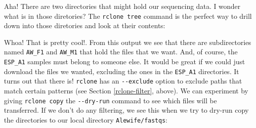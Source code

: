 \documentclass[]{krantz}
\makeatletter
\newenvironment{Shaded}{\begin{snugshade}}{\end{snugshade}}
\newcommand{\ExtensionTok}[1]{#1}
\newcommand{\NormalTok}[1]{#1}
\newenvironment{kframe}{%
\medskip{}
\setlength{\fboxsep}{.8em}
 \def\at@end@of@kframe{}%
 \ifinner\ifhmode%
  \def\at@end@of@kframe{\end{minipage}}%
  \begin{minipage}{\columnwidth}%
 \fi\fi%
 \def\FrameCommand##1{\hskip\@totalleftmargin \hskip-\fboxsep
 \colorbox{shadecolor}{##1}\hskip-\fboxsep
     \hskip-\linewidth \hskip-\@totalleftmargin \hskip\columnwidth}%
 \MakeFramed {\advance\hsize-\width
   \@totalleftmargin\z@ \linewidth\hsize
   \@setminipage}}%
 {\par\unskip\endMakeFramed%
 \at@end@of@kframe}
\renewenvironment{Shaded}{\begin{kframe}}{\end{kframe}}
\makeatother
\begin{document}
Aha! There are two directories that might hold our sequencing data.
I wonder what is in those diretories? The \texttt{rclone\ tree} command is the
perfect way to drill down into those diretories and look at their contents:

\begin{Shaded}
\end{Shaded}

Whoa! That is pretty cool!. From this output we see that there are
subdirectories named \texttt{AW\_F1} and \texttt{AW\_M1} that hold the files that
we want. And, of course, the \texttt{ESP\_A1} samples must belong to someone
else. It would be great if we could just download the files we wanted,
excluding the ones in the \texttt{ESP\_A1} directories. It turns out that there is!
\texttt{rclone} has an \texttt{-\/-exclude} option to exclude paths that match certain
patterns (see Section \ref{rclone-filter}, above). We can
experiment by giving \texttt{rclone\ copy} the \texttt{-\/-dry-run} command to see which
files will be transferred. If we don't do any filtering, we see this
when we try to dry-run copy the directories to our local directory \texttt{Alewife/fastqs}:
\end{document}
